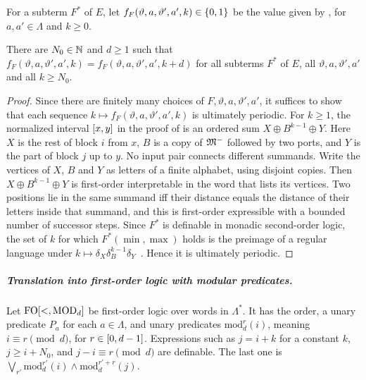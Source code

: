 For a subterm $F^{*}$ of $E$, let $f_F(\vartheta, a, \vartheta', a', k) \in \{0,1\}$ be the value given by , for $a, a' \in \Lambda$ and $k \ge 0$.

\begin{lemma}[Periodicity]\label{lemma: periodicity}
  There are $N_0 \in \mathbb{N}$ and $d \ge 1$ such that $f_F(\vartheta, a, \vartheta', a', k) = f_F(\vartheta, a, \vartheta', a', k + d)$ for all subterms $F^{*}$ of $E$, all $\vartheta, a, \vartheta', a'$ and all $k \ge N_0$.
\end{lemma}
\begin{proof}
  Since there are finitely many choices of $F, \vartheta, a, \vartheta', a'$, it suffices to show that each sequence $k \mapsto f_F(\vartheta, a, \vartheta', a', k)$ is ultimately periodic.
  For $k \ge 1$, the normalized interval $[x, y]$ in the proof of  is an ordered sum $X \oplus B^{k-1} \oplus Y$.
  Here $X$ is the rest of block $i$ from $x$, $B$ is a copy of $\mathfrak{M}^{-}$ followed by two ports, and $Y$ is the part of block $j$ up to $y$.
  No input pair connects different summands.
  Write the vertices of $X$, $B$ and $Y$ as letters of a finite alphabet, using disjoint copies.
  Then $X \oplus B^{k-1} \oplus Y$ is first-order interpretable in the word that lists its vertices.
  Two positions lie in the same summand iff their distance equals the distance of their letters inside that summand, and this is first-order expressible with a bounded number of successor steps.
  Since $F^{*}$ is definable in monadic second-order logic, the set of $k$ for which $F^{*}(\min, \max)$ holds is the preimage of a regular language under $k \mapsto \delta_X \delta_B^{k-1} \delta_Y$~\cite{buchiWeakSecondorderArithmetic1960}.
  Hence it is ultimately periodic.
\end{proof}

\subparagraph*{Translation into first-order logic with modular predicates.}
Let $\mathrm{FO}[<, \mathrm{MOD}_{d}]$ be first-order logic over words in $\Lambda^{*}$.
It has the order, a unary predicate $P_a$ for each $a \in \Lambda$, and unary predicates $\mathrm{mod}^{r}_{d}(i)$, meaning $i \equiv r \pmod d$, for $r \in [0, d-1]$.
Expressions such as $j = i + k$ for a constant $k$, $j \ge i + N_0$, and $j - i \equiv r \pmod d$ are definable.
The last one is $\bigvee_{r'} \mathrm{mod}^{r'}_d(i) \wedge \mathrm{mod}^{r' + r}_d(j)$.

